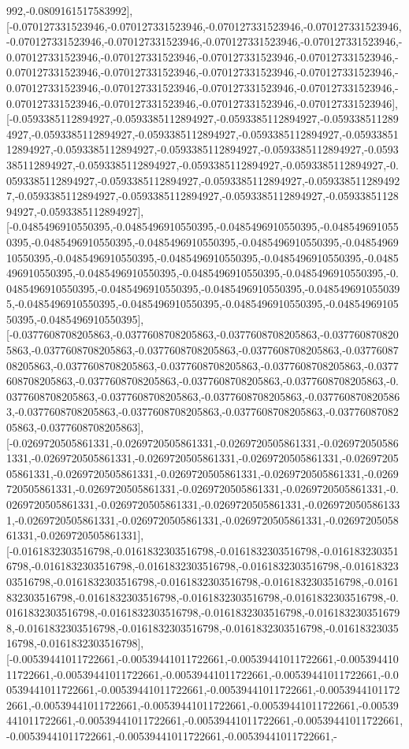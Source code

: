\documentclass{article}
\begin{document}
992,-0.0809161517583992],[-0.070127331523946,-0.070127331523946,-0.070127331523946,-0.070127331523946,-0.070127331523946,-0.070127331523946,-0.070127331523946,-0.070127331523946,-0.070127331523946,-0.070127331523946,-0.070127331523946,-0.070127331523946,-0.070127331523946,-0.070127331523946,-0.070127331523946,-0.070127331523946,-0.070127331523946,-0.070127331523946,-0.070127331523946,-0.070127331523946,-0.070127331523946,-0.070127331523946,-0.070127331523946,-0.070127331523946],[-0.0593385112894927,-0.0593385112894927,-0.0593385112894927,-0.0593385112894927,-0.0593385112894927,-0.0593385112894927,-0.0593385112894927,-0.0593385112894927,-0.0593385112894927,-0.0593385112894927,-0.0593385112894927,-0.0593385112894927,-0.0593385112894927,-0.0593385112894927,-0.0593385112894927,-0.0593385112894927,-0.0593385112894927,-0.0593385112894927,-0.0593385112894927,-0.0593385112894927,-0.0593385112894927,-0.0593385112894927,-0.0593385112894927,-0.0593385112894927],[-0.0485496910550395,-0.0485496910550395,-0.0485496910550395,-0.0485496910550395,-0.0485496910550395,-0.0485496910550395,-0.0485496910550395,-0.0485496910550395,-0.0485496910550395,-0.0485496910550395,-0.0485496910550395,-0.0485496910550395,-0.0485496910550395,-0.0485496910550395,-0.0485496910550395,-0.0485496910550395,-0.0485496910550395,-0.0485496910550395,-0.0485496910550395,-0.0485496910550395,-0.0485496910550395,-0.0485496910550395,-0.0485496910550395,-0.0485496910550395],[-0.0377608708205863,-0.0377608708205863,-0.0377608708205863,-0.0377608708205863,-0.0377608708205863,-0.0377608708205863,-0.0377608708205863,-0.0377608708205863,-0.0377608708205863,-0.0377608708205863,-0.0377608708205863,-0.0377608708205863,-0.0377608708205863,-0.0377608708205863,-0.0377608708205863,-0.0377608708205863,-0.0377608708205863,-0.0377608708205863,-0.0377608708205863,-0.0377608708205863,-0.0377608708205863,-0.0377608708205863,-0.0377608708205863,-0.0377608708205863],[-0.0269720505861331,-0.0269720505861331,-0.0269720505861331,-0.0269720505861331,-0.0269720505861331,-0.0269720505861331,-0.0269720505861331,-0.0269720505861331,-0.0269720505861331,-0.0269720505861331,-0.0269720505861331,-0.0269720505861331,-0.0269720505861331,-0.0269720505861331,-0.0269720505861331,-0.0269720505861331,-0.0269720505861331,-0.0269720505861331,-0.0269720505861331,-0.0269720505861331,-0.0269720505861331,-0.0269720505861331,-0.0269720505861331,-0.0269720505861331],[-0.0161832303516798,-0.0161832303516798,-0.0161832303516798,-0.0161832303516798,-0.0161832303516798,-0.0161832303516798,-0.0161832303516798,-0.0161832303516798,-0.0161832303516798,-0.0161832303516798,-0.0161832303516798,-0.0161832303516798,-0.0161832303516798,-0.0161832303516798,-0.0161832303516798,-0.0161832303516798,-0.0161832303516798,-0.0161832303516798,-0.0161832303516798,-0.0161832303516798,-0.0161832303516798,-0.0161832303516798,-0.0161832303516798,-0.0161832303516798],[-0.00539441011722661,-0.00539441011722661,-0.00539441011722661,-0.00539441011722661,-0.00539441011722661,-0.00539441011722661,-0.00539441011722661,-0.00539441011722661,-0.00539441011722661,-0.00539441011722661,-0.00539441011722661,-0.00539441011722661,-0.00539441011722661,-0.00539441011722661,-0.00539441011722661,-0.00539441011722661,-0.00539441011722661,-0.00539441011722661,-0.00539441011722661,-0.00539441011722661,-0.00539441011722661,-
\end{document}
